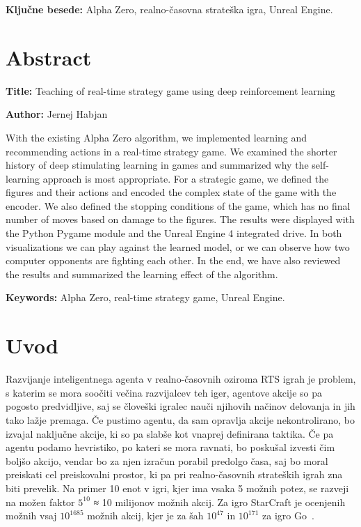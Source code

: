 \documentclass[a4paper, 12pt]{book}
\newcommand{\ttitleEn}{Teaching of real-time strategy game using deep reinforcement learning}
\newcommand{\tauthor}{Jernej Habjan}
\newcommand{\tkeywords}{Alpha Zero, realno-časovna strateška igra, Unreal Engine}
\newcommand{\tkeywordsEn}{Alpha Zero, real-time strategy game, Unreal Engine}
\newcommand{\clearemptydoublepage}{\newpage{\pagestyle{empty}\cleardoublepage}}
\begin{document}
\noindent\textbf{Ključne besede:} \tkeywords.
\clearemptydoublepage

\chapter*{Abstract}

\noindent\textbf{Title:} \ttitleEn
\bigskip

\noindent\textbf{Author:} \tauthor
\bigskip

\noindent With the existing Alpha Zero algorithm, we implemented learning and recommending actions in a real-time strategy game.
We examined the shorter history of deep stimulating learning in games and summarized why the self-learning approach is most appropriate.
For a strategic game, we defined the figures and their actions and encoded the complex state of the game with the encoder.
We also defined the stopping conditions of the game, which has no final number of moves based on damage to the figures.
The results were displayed with the Python Pygame module and the Unreal Engine 4 integrated drive.
In both visualizations we can play against the learned model, or we can observe how two computer opponents are fighting each other.
In the end, we have also reviewed the results and summarized the learning effect of the algorithm.
\bigskip

\noindent\textbf{Keywords:} \tkeywordsEn.
\clearemptydoublepage

\mainmatter
\setcounter{page}{1}
\pagestyle{fancy}

\chapter{Uvod}


Razvijanje inteligentnega agenta v realno-časovnih oziroma RTS igrah je problem, s katerim se mora soočiti večina razvijalcev teh iger, agentove akcije so pa pogosto predvidljive, saj se človeški igralec nauči njihovih načinov delovanja in jih tako lažje premaga.
Če pustimo agentu, da sam opravlja akcije nekontrolirano, bo izvajal naključne akcije, ki so pa slabše kot vnaprej definirana taktika.
Če pa agentu podamo hevristiko, po kateri se mora ravnati, bo poskušal izvesti čim boljšo akcijo, vendar bo za njen izračun porabil predolgo časa, saj bo moral preiskati cel preiskovalni prostor, ki pa pri realno-časovnih strateških igrah zna biti prevelik.
Na primer 10 enot v igri, kjer ima vsaka 5 možnih potez, se razveji na možen faktor $5^{10}$ ≈ 10 milijonov možnih akcij.
Za igro StarCraft je ocenjenih možnih vsaj $10^{1685}$ možnih akcij, kjer je za šah $10^{47}$ in $10^{171}$ za igro Go~\cite{ontanon2017combinatorial}.
\end{document}
